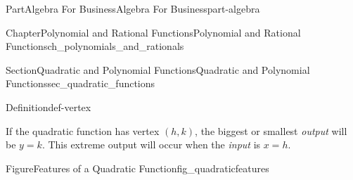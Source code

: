 \documentclass[oneside,10pt,]{tufte-book}
\numberwithin{equation}{chapter}
\begin{document}
\begin{partptx}{Part}{Algebra For Business}{}{Algebra For Business}{}{}{part-algebra}
\begin{chapterptx}{Chapter}{Polynomial and Rational Functions}{}{Polynomial and Rational Functions}{}{}{ch_polynomials_and_rationals}
\begin{sectionptx}{Section}{Quadratic and Polynomial Functions}{}{Quadratic and Polynomial Functions}{}{}{sec_quadratic_functions}
\begin{definition}{Definition}{}{def-vertex}
\end{definition}
If the quadratic function has vertex \((h,k)\), the biggest or smallest \emph{output} will be \(y=k\).  This extreme output will occur when the \emph{input} is \(x=h\).%
\begin{figureptx}{Figure}{Features of a Quadratic Function}{fig_quadraticfeatures}{}%
\begin{image}{0.3}{0.4}{0.3}{}%
\end{image}
\end{figureptx}
\end{sectionptx}
\end{chapterptx}
\end{partptx}
\end{document}
